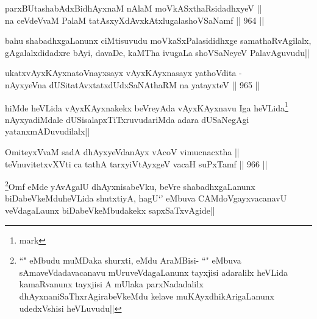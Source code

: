 \begin{shl}
parxBUtashabAdxBidhAyxnaM nAlaM moVkASxthaRsidadhxyeV || \\
na ceVdeVvaM PalaM tatAsxyXdAvxkAtxlugalashoVSaNamf ||  964 ||  
\end{shl}	

\begin{artha}
bahu shabadhxgaLanunx ciMtisuvudu moVkaSxPalasididhxge samathaRvAgilalx, gAgalalxdidadxre bAyi, davaDe, kaMTha ivugaLa shoVSaNeyeV PalavAguvudu||
\end{artha}


\begin{shl}
ukatxvAyxKAyxnatoV\s nayxsayx vAyxKAyxnasayx yathoVdita - \\
nAyxyeVna dUSitatAvxtatxdUdxSaNAthaRM na yatayxteV ||  965 ||  
\end{shl}

\begin{artha}
hiMde heVLida vAyxKAyxnakekx beVreyAda vAyxKAyxnavu Iga heVLida\footnote{mark} nAyxyadiMdale dUSisalapxTiTxruvudariMda adara dUSaNegAgi yatanxmADuvudilalx||
\end{artha}


\begin{shl}
OmiteyxVvaM sadA dhAyxyeVdanAyx vAcoV vimucnacxtha || \\
teV\s nuvitetxvXVti ca tathA tarxyiVtAyxgeV vacaH suPxTamf ||  966 ||  
\end{shl}


\begin{artha}
\footnote{``\stext" eMbudu muMDaka shurxti, \stext eMdu AraMBisi- ``\stext" eMbuva sAmaveVdadavacanavu mUruveVdagaLanunx tayxjisi adaralilx heVLida kamaRvanunx tayxjisi A mUlaka parxNadadalilx dhAyxnaniSaThxrAgirabeVkeMdu kelave muKAyxdhikArigaLanunx udedxVshisi heVLuvudu||}Omf eMde yAvAgalU dhAyxnisabeVku, beVre shabadhxgaLanunx biDabeVkeMduheVLida shutxtiyA, hagU`\stext' eMbuva CAMdoVgayxvacanavU veVdagaLaunx biDabeVkeMbudakekx sapxSaTxvAgide||
\end{artha}

